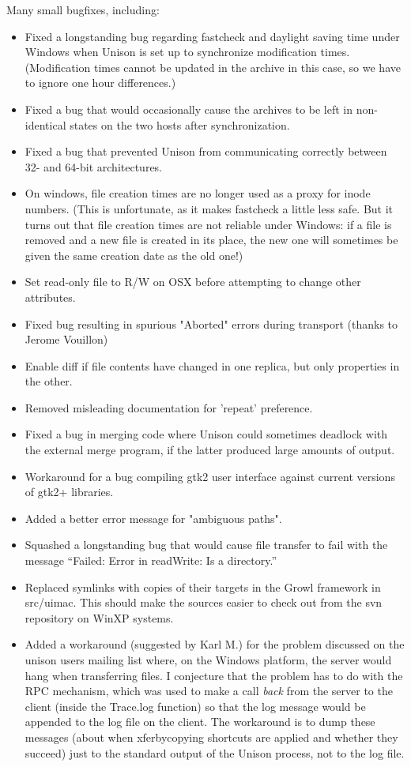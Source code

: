 \begin{changesfromversion}{2.17}
\item Many small bugfixes, including:
\begin{itemize}
\item Fixed a longstanding bug regarding fastcheck and daylight saving time
  under Windows when Unison is set up to synchronize modification times.
  (Modification times cannot be updated in the archive in this case,
  so we have to ignore one hour differences.)
\item Fixed a bug that would occasionally cause the archives to be left in
  non-identical states on the two hosts after synchronization.
\item Fixed a bug that prevented Unison from communicating correctly between
  32- and 64-bit architectures.
\item On windows, file creation times are no longer used as a proxy for
  inode numbers.  (This is unfortunate, as it makes fastcheck a little less
  safe.  But it turns out that file creation times are not reliable 
  under Windows: if a file is removed and a new file is created in its
  place, the new one will sometimes be given the same creation date as the
  old one!)
\item Set read-only file to R/W on OSX before attempting to change other attributes.
\item Fixed bug resulting in spurious "Aborted" errors during transport
(thanks to Jerome Vouillon) 
\item Enable diff if file contents have changed in one replica, but
only properties in the other.
\item Removed misleading documentation for 'repeat' preference.
\item Fixed a bug in merging code where Unison could sometimes deadlock
  with the external merge program, if the latter produced large
  amounts of output.
\item Workaround for a bug compiling gtk2 user interface against current versions
  of gtk2+ libraries.  
\item Added a better error message for "ambiguous paths".
\item Squashed a longstanding bug that would cause file transfer to fail
  with the message ``Failed: Error in readWrite: Is a directory.''
\item Replaced symlinks with copies of their targets in the Growl framework in src/uimac.
  This should make the sources easier to check out from the svn repository on WinXP
  systems.
\item Added a workaround (suggested by Karl M.) for the problem discussed
  on the unison users mailing list where, on the Windows platform, the
  server would hang when transferring files.  I conjecture that
  the problem has to do with the RPC mechanism, which was used to
  make a call {\em back} from the server to the client (inside the Trace.log 
  function) so that the log message would be appended to the log file on 
  the client.  The workaround is to dump these messages (about when
  xferbycopying shortcuts are applied and whether they succeed) just to the
  standard output of the Unison process, not to the log file.
\end{itemize}
\end{changesfromversion}

